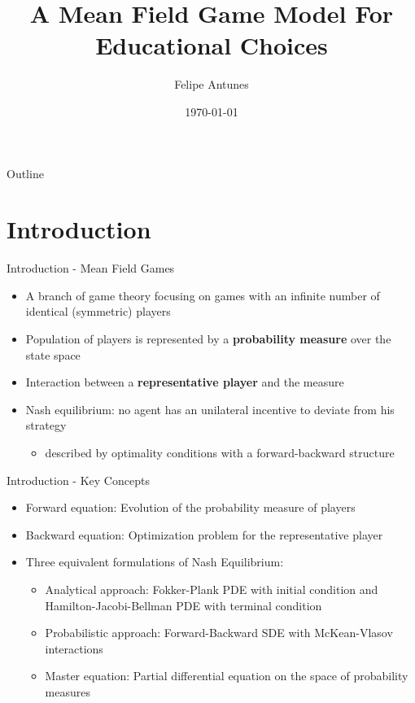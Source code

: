 \documentclass{beamer}
\title[A Mean Field Game Model For Educational Choices]{A Mean Field Game Model For Educational Choices}
\author{Felipe Antunes}
\date{\today}
\newcommand{\highlight}[1]{{
\bf{#1}
}}
\begin{document}
\begin{frame}
\titlepage
\end{frame}

\begin{frame}{Outline}
\tableofcontents
\end{frame}

\section{Introduction}

\begin{frame}{Introduction - Mean Field Games}

\begin{itemize}
    \item A branch of game theory focusing on games with an infinite number of identical (symmetric) players
    \item Population of players is represented by a \highlight{probability measure} over the state space
    \item Interaction between a \highlight{representative player} and the measure
    \item Nash equilibrium: no agent has an unilateral incentive to deviate from his strategy
    \begin{itemize}
        \item described by optimality conditions with a forward-backward structure
    \end{itemize}
\end{itemize}
\end{frame}


\begin{frame}{Introduction - Key Concepts}
\begin{itemize}
    \item Forward equation: Evolution of the probability measure of players
    \item Backward equation: Optimization problem for the representative player
    \item Three equivalent formulations of Nash Equilibrium:
\begin{itemize}
    \item Analytical approach: Fokker-Plank PDE with initial condition and Hamilton-Jacobi-Bellman PDE with terminal condition
    \item Probabilistic approach: Forward-Backward SDE with McKean-Vlasov interactions
    \item Master equation: Partial differential equation on the space of probability measures
\end{itemize}

\end{itemize}
\end{frame}
\end{document}
